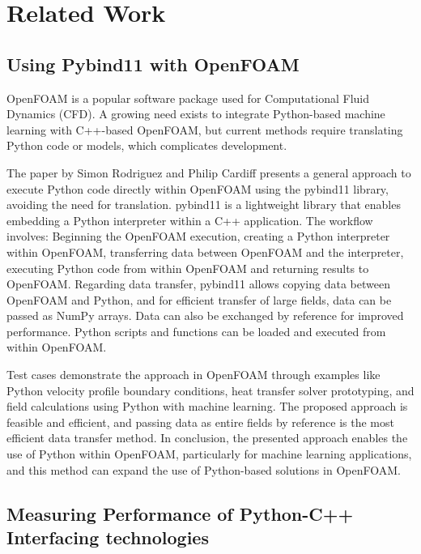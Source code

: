 \chapter{Related Work}\label{chapter:Related Work}

\section{Using Pybind11 with OpenFOAM}\label{sec:using-pybind11-in-openfoam} 

OpenFOAM is a popular software package used for Computational Fluid Dynamics (CFD). A growing need exists to integrate Python-based machine learning with C++-based OpenFOAM, but current methods require translating Python code or models, which complicates development. \cite{rw-openfoam-website}

The paper by Simon Rodriguez and Philip Cardiff presents a general approach to execute Python code directly within OpenFOAM using the pybind11 library, avoiding the need for translation. pybind11 is a lightweight library that enables embedding a Python interpreter within a C++ application. The workflow involves: Beginning the OpenFOAM execution, creating a Python interpreter within OpenFOAM, transferring data between OpenFOAM and the interpreter, executing Python code from within OpenFOAM and returning results to OpenFOAM. Regarding data transfer, pybind11 allows copying data between OpenFOAM and Python, and for efficient transfer of large fields, data can be passed as NumPy arrays. Data can also be exchanged by reference for improved performance. Python scripts and functions can be loaded and executed from within OpenFOAM. \cite{rw-openfoam}

Test cases demonstrate the approach in OpenFOAM through examples like Python velocity profile boundary conditions, heat transfer solver prototyping, and field calculations using Python with machine learning. The proposed approach is feasible and efficient, and passing data as entire fields by reference is the most efficient data transfer method. In conclusion, the presented approach enables the use of Python within OpenFOAM, particularly for machine learning applications, and this method can expand the use of Python-based solutions in OpenFOAM. \cite{rw-openfoam}

\section{Measuring Performance of Python-C++ Interfacing technologies}

